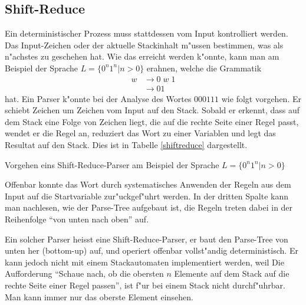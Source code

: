 \subsection{Shift-Reduce}
Ein deterministischer Prozess muss stattdessen vom Input kontrolliert werden.
Das Input-Zeichen oder der aktuelle Stackinhalt m"ussen bestimmen, was
als n"achstes zu geschehen hat. Wie das erreicht werden k"onnte, kann man am
Beispiel der Sprache $L=\{0^n1^n|n> 0\}$ erahnen, welche die
Grammatik
\begin{align}
w&\rightarrow 0\;w\;1\tag{1}\\
&\rightarrow 01\tag{2}
\end{align}
hat. Ein Parser k"onnte bei der Analyse des Wortes $000111$ wie folgt vorgehen.
Er schiebt Zeichen um Zeichen vom Input auf den Stack. Sobald
er erkennt, dass auf dem Stack eine Folge von Zeichen liegt, die auf die rechte
Seite einer Regel passt, wendet er die Regel an, reduziert das Wort zu einer
Variablen und legt das Resultat auf den Stack. Dies ist in Tabelle \ref{shiftreduce}
dargestellt.

\begin{table}[H]

\caption{Vorgehen eins Shift-Reduce-Parser am Beispiel der Sprache $L=\{0^n1^n|n>0\}$
\label{shiftreduce}}
\end{table}
Offenbar konnte das Wort durch systematisches Anwenden der Regeln aus dem Input
auf die Startvariable zur"uckgef"uhrt werden.
In der dritten Spalte kann man nachlesen, wie der Parse-Tree aufgebaut ist,
die Regeln treten dabei in der Reihenfolge ``von unten nach oben'' auf.

Ein solcher Parser heisst eine Shift-Reduce-Parser, er baut den Parse-Tree von unten
her (bottom-up) auf, und operiert offenbar vollst"andig deterministisch.
Er kann jedoch nicht mit einem Stackautomaten implementiert werden,
weil Die Aufforderung ``Schaue nach, ob die obersten $n$ Elemente auf dem Stack
auf die rechte Seite einer Regel passen'', ist f"ur bei einem Stack nicht
durchf"uhrbar. Man kann immer nur das oberste Element einsehen.


